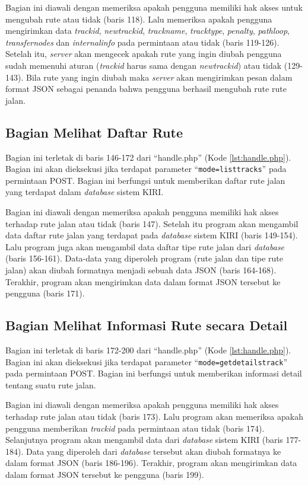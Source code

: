 Bagian ini diawali dengan memeriksa apakah pengguna memiliki hak akses untuk mengubah rute atau tidak (baris 118). Lalu memeriksa apakah pengguna mengirimkan data \textit{trackid}, \textit{newtrackid}, \textit{trackname}, \textit{tracktype}, \textit{penalty}, \textit{pathloop}, \textit{transfernodes}  dan \textit{internalinfo} pada permintaan atau tidak (baris 119-126). Setelah itu, \textit{server} akan mengecek apakah rute yang ingin diubah pengguna sudah memenuhi aturan (\textit{trackid} harus sama dengan \textit{newtrackid}) atau tidak (129-143). Bila rute yang ingin diubah maka \textit{server} akan mengirimkan pesan dalam format JSON sebagai penanda bahwa pengguna berhasil mengubah rute rute jalan.

\subsection{Bagian Melihat Daftar Rute}
\label{sec:melihatdaftarrute}
Bagian ini terletak di baris 146-172 dari ``handle.php'' (Kode \ref{lst:handle.php}). Bagian ini akan dieksekusi jika terdapat parameter ``\texttt{mode=listtracks}'' pada permintaan POST. Bagian ini berfungsi untuk memberikan daftar rute jalan yang terdapat dalam \textit{database} sistem KIRI.

Bagian ini diawali dengan memeriksa apakah pengguna memiliki hak akses terhadap rute jalan atau tidak (baris 147). Setelah itu program akan mengambil data daftar rute jalan yang terdapat pada \textit{database} sistem KIRI (baris 149-154). Lalu program juga akan mengambil data daftar tipe rute jalan dari \textit{database} (baris 156-161). Data-data yang diperoleh program (rute jalan dan tipe rute jalan) akan diubah formatnya menjadi sebuah data JSON (baris 164-168). Terakhir, program akan mengirimkan data dalam format JSON tersebut ke pengguna (baris 171).

\subsection{Bagian Melihat Informasi Rute secara Detail}
\label{sec:melihatdaftarrutedetail}
Bagian ini terletak di baris 172-200 dari ``handle.php'' (Kode \ref{lst:handle.php}). Bagian ini akan dieksekusi jika terdapat parameter ``\texttt{mode=getdetailstrack}'' pada permintaan POST. Bagian ini berfungsi untuk memberikan informasi detail tentang suatu rute jalan.

Bagian ini diawali dengan memeriksa apakah pengguna memiliki hak akses terhadap rute jalan atau tidak (baris 173). Lalu program akan memeriksa apakah pengguna memberikan \textit{trackid} pada permintaan atau tidak (baris 174). Selanjutnya program akan mengambil data dari \textit{database} sistem KIRI (baris 177-184). Data yang diperoleh dari \textit{database} tersebut akan diubah formatnya ke dalam format JSON (baris 186-196). Terakhir, program akan mengirimkan data dalam format JSON tersebut ke pengguna (baris 199).

